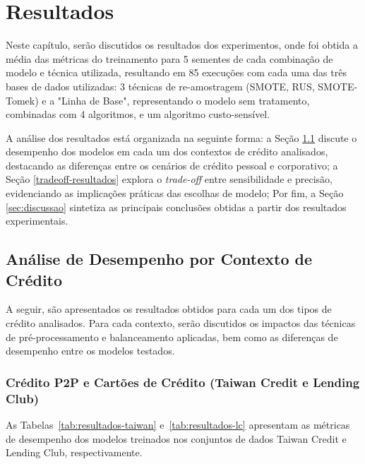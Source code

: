 \chapter{Resultados}\label{cap:resultados}

Neste capítulo, serão discutidos os resultados dos experimentos, onde foi obtida a média das métricas do treinamento para 5 sementes de cada combinação de modelo e técnica utilizada, resultando em 85 execuções com cada uma das três bases de dados utilizadas: 3 técnicas de re-amostragem (SMOTE, RUS, SMOTE-Tomek) e a "Linha de Base", representando o modelo sem tratamento, combinadas com 4 algoritmos, e um algoritmo custo-sensível.

A análise dos resultados está organizada na seguinte forma: a Seção \ref{sec:analise-por-contexto} discute o desempenho dos modelos em cada um dos contextos de crédito analisados, destacando as diferenças entre os cenários de crédito pessoal e corporativo; a Seção \ref{tradeoff-resultados} explora o \textit{trade-off} entre sensibilidade e precisão, evidenciando as implicações práticas das escolhas de modelo; Por fim, a Seção \ref{sec:discussao} sintetiza as principais conclusões obtidas a partir dos resultados experimentais.

\section{Análise de Desempenho por Contexto de Crédito}\label{sec:analise-por-contexto}

A seguir, são apresentados os resultados obtidos para cada um dos tipos de crédito analisados. Para cada contexto, serão discutidos os impactos das técnicas de pré-processamento e balanceamento aplicadas, bem como as diferenças de desempenho entre os modelos testados.

\subsection{Crédito P2P e Cartões de Crédito (Taiwan Credit e Lending Club)}\label{sec:analise-varejo}

As Tabelas~\ref{tab:resultados-taiwan} e~\ref{tab:resultados-lc} apresentam as métricas de desempenho dos modelos treinados nos conjuntos de dados Taiwan Credit e Lending Club, respectivamente.

